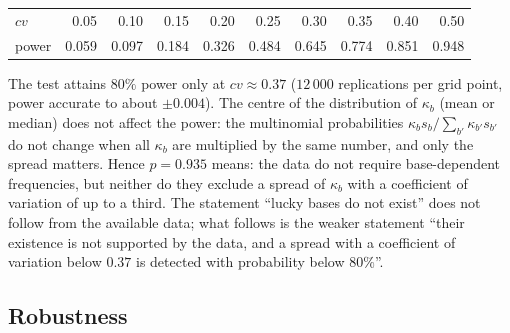 \documentclass[11pt,a4paper]{article}
\theoremstyle{plain}
\theoremstyle{remark}
\begin{document}
\begin{center}
\small
\begin{tabular}{lrrrrrrrrr}
\toprule
$cv$ & 0.05 & 0.10 & 0.15 & 0.20 & 0.25 & 0.30 & 0.35 & 0.40 & 0.50\\
power & 0.059 & 0.097 & 0.184 & 0.326 & 0.484 & 0.645 & 0.774 & 0.851 & 0.948\\
\bottomrule
\end{tabular}
\end{center}

The test attains $80\%$ power only at $cv\approx0.37$ ($12\,000$ replications
per grid point, power accurate to about $\pm0.004$). The centre of the
distribution of $\kappa_b$ (mean or median) does not affect the power: the
multinomial probabilities $\kappa_bs_b/\sum_{b'}\kappa_{b'}s_{b'}$ do not change
when all $\kappa_b$ are multiplied by the same number, and only the spread
matters. Hence $p=0.935$ means: the
data do not require base-dependent frequencies, but neither do they exclude a
spread of $\kappa_b$ with a coefficient of variation of up to a third. The
statement ``lucky bases do not exist'' does not follow from the available data;
what follows is the weaker statement ``their existence is not supported by the
data, and a spread with a coefficient of variation below $0.37$ is detected with
probability below $80\%$''.

\subsection{Robustness}\label{sec:robust}
\end{document}
